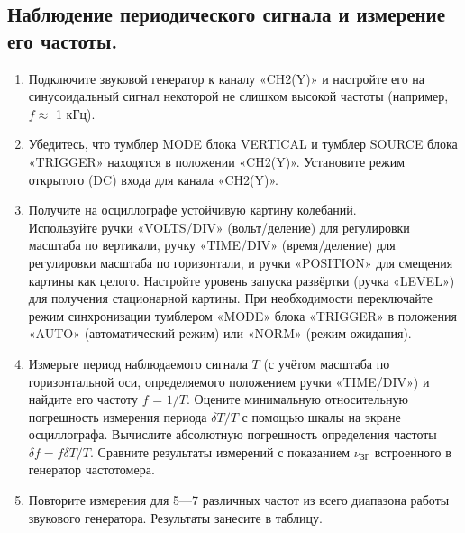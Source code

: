 \documentclass[a4paper,12pt]{article} %
\begin{document}
	\subsection{Наблюдение периодического сигнала и измерение его частоты.}
	\begin{enumerate}
		\item Подключите звуковой генератор к каналу «CH2(Y)» и настройте
		его на синусоидальный сигнал некоторой не слишком высокой частоты
		(например, $f \approx$ 1 кГц).
		\item Убедитесь, что тумблер MODE блока
		VERTICAL и тумблер SOURCE блока «TRIGGER» находятся
		в положении «CH2(Y)». Установите режим открытого (DC) входа
		для канала «CH2(Y)».
		\item Получите на осциллографе устойчивую картину колебаний. \\
		Используйте ручки «VOLTS/DIV» (вольт/деление)
		для регулировки масштаба по вертикали, ручку «TIME/DIV» (время/деление)
		для регулировки масштаба по горизонтали, и ручки «POSITION»
		для смещения картины как целого. Настройте уровень запуска развёртки (ручка «LEVEL») для получения стационарной картины.
		При необходимости переключайте режим синхронизации тумблером «MODE» блока «TRIGGER» в положения «AUTO» (автоматический режим) или «NORM» (режим ожидания).
		\item Измерьте период наблюдаемого сигнала $T$ (с учётом масштаба по горизонтальной оси, определяемого положением ручки
		«TIME/DIV») и найдите его частоту $f$ = $1/T$. Оцените минимальную относительную погрешность измерения периода $\delta T / T$ с помощью шкалы на экране осциллографа. Вычислите абсолютную погрешность определения частоты $\delta f = f\delta T /T$. Сравните результаты
		измерений с показанием $\nu_{\text{ЗГ}}$ встроенного в генератор частотомера.
		\item Повторите измерения для 5—7 различных частот из всего диапазона работы звукового генератора. Результаты занесите в таблицу.
	\end{enumerate}
\end{document}
